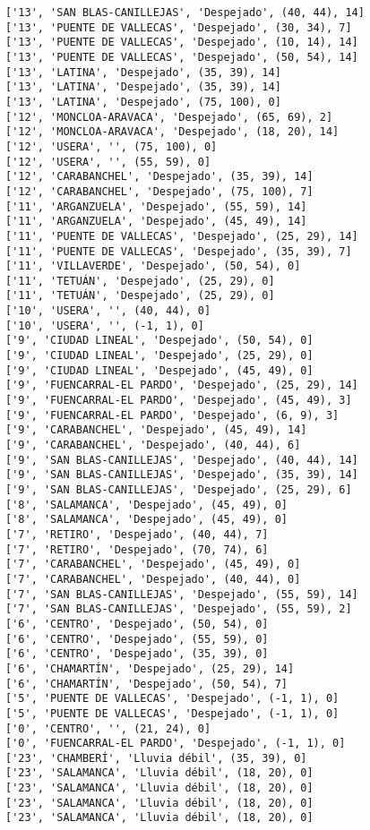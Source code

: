 \documentclass[11pt]{article}
\begin{document}
\begin{Verbatim}[commandchars=\\\{\}]
['13', 'SAN BLAS-CANILLEJAS', 'Despejado', (40, 44), 14]
['13', 'PUENTE DE VALLECAS', 'Despejado', (30, 34), 7]
['13', 'PUENTE DE VALLECAS', 'Despejado', (10, 14), 14]
['13', 'PUENTE DE VALLECAS', 'Despejado', (50, 54), 14]
['13', 'LATINA', 'Despejado', (35, 39), 14]
['13', 'LATINA', 'Despejado', (35, 39), 14]
['13', 'LATINA', 'Despejado', (75, 100), 0]
['12', 'MONCLOA-ARAVACA', 'Despejado', (65, 69), 2]
['12', 'MONCLOA-ARAVACA', 'Despejado', (18, 20), 14]
['12', 'USERA', '', (75, 100), 0]
['12', 'USERA', '', (55, 59), 0]
['12', 'CARABANCHEL', 'Despejado', (35, 39), 14]
['12', 'CARABANCHEL', 'Despejado', (75, 100), 7]
['11', 'ARGANZUELA', 'Despejado', (55, 59), 14]
['11', 'ARGANZUELA', 'Despejado', (45, 49), 14]
['11', 'PUENTE DE VALLECAS', 'Despejado', (25, 29), 14]
['11', 'PUENTE DE VALLECAS', 'Despejado', (35, 39), 7]
['11', 'VILLAVERDE', 'Despejado', (50, 54), 0]
['11', 'TETUÁN', 'Despejado', (25, 29), 0]
['11', 'TETUÁN', 'Despejado', (25, 29), 0]
['10', 'USERA', '', (40, 44), 0]
['10', 'USERA', '', (-1, 1), 0]
['9', 'CIUDAD LINEAL', 'Despejado', (50, 54), 0]
['9', 'CIUDAD LINEAL', 'Despejado', (25, 29), 0]
['9', 'CIUDAD LINEAL', 'Despejado', (45, 49), 0]
['9', 'FUENCARRAL-EL PARDO', 'Despejado', (25, 29), 14]
['9', 'FUENCARRAL-EL PARDO', 'Despejado', (45, 49), 3]
['9', 'FUENCARRAL-EL PARDO', 'Despejado', (6, 9), 3]
['9', 'CARABANCHEL', 'Despejado', (45, 49), 14]
['9', 'CARABANCHEL', 'Despejado', (40, 44), 6]
['9', 'SAN BLAS-CANILLEJAS', 'Despejado', (40, 44), 14]
['9', 'SAN BLAS-CANILLEJAS', 'Despejado', (35, 39), 14]
['9', 'SAN BLAS-CANILLEJAS', 'Despejado', (25, 29), 6]
['8', 'SALAMANCA', 'Despejado', (45, 49), 0]
['8', 'SALAMANCA', 'Despejado', (45, 49), 0]
['7', 'RETIRO', 'Despejado', (40, 44), 7]
['7', 'RETIRO', 'Despejado', (70, 74), 6]
['7', 'CARABANCHEL', 'Despejado', (45, 49), 0]
['7', 'CARABANCHEL', 'Despejado', (40, 44), 0]
['7', 'SAN BLAS-CANILLEJAS', 'Despejado', (55, 59), 14]
['7', 'SAN BLAS-CANILLEJAS', 'Despejado', (55, 59), 2]
['6', 'CENTRO', 'Despejado', (50, 54), 0]
['6', 'CENTRO', 'Despejado', (55, 59), 0]
['6', 'CENTRO', 'Despejado', (35, 39), 0]
['6', 'CHAMARTÍN', 'Despejado', (25, 29), 14]
['6', 'CHAMARTÍN', 'Despejado', (50, 54), 7]
['5', 'PUENTE DE VALLECAS', 'Despejado', (-1, 1), 0]
['5', 'PUENTE DE VALLECAS', 'Despejado', (-1, 1), 0]
['0', 'CENTRO', '', (21, 24), 0]
['0', 'FUENCARRAL-EL PARDO', 'Despejado', (-1, 1), 0]
['23', 'CHAMBERÍ', 'Lluvia débil', (35, 39), 0]
['23', 'SALAMANCA', 'Lluvia débil', (18, 20), 0]
['23', 'SALAMANCA', 'Lluvia débil', (18, 20), 0]
['23', 'SALAMANCA', 'Lluvia débil', (18, 20), 0]
['23', 'SALAMANCA', 'Lluvia débil', (18, 20), 0]

\end{Verbatim}
\end{document}
